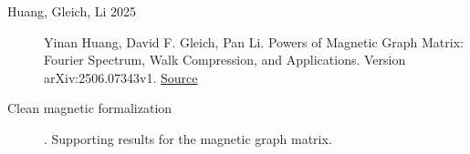 \begin{description}
\item[Huang, Gleich, Li 2025] Yinan Huang, David F. Gleich, Pan Li. Powers of Magnetic Graph Matrix: Fourier Spectrum, Walk Compression, and Applications. Version arXiv:2506.07343v1. \href{https://arxiv.org/html/2506.07343v1}{Source}
\item[Clean magnetic formalization] . Supporting results for the magnetic graph matrix.
\end{description}

